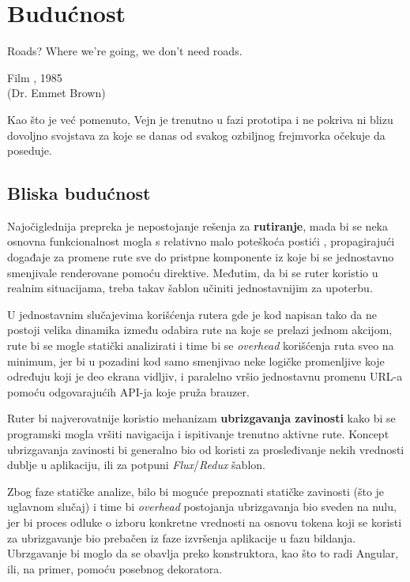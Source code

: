\chapter{Budućnost}

\epigraph{
  Roads? Where we're going, we don't need roads.
}{Film , 1985\\(Dr. Emmet Brown)}

Kao što je već pomenuto, Vejn je trenutno u fazi prototipa i ne pokriva ni blizu dovoljno svojstava za koje se danas od svakog ozbiljnog frejmvorka očekuje da poseduje.

\section{Bliska budućnost}

Najočiglednija prepreka je nepostojanje rešenja za \textbf{rutiranje}, mada bi se neka osnovna funkcionalnost mogla s relativno malo poteškoća postići , propagirajući događaje za promene rute sve do pristpne komponente iz koje bi se jednostavno smenjivale renderovane  pomoću  direktive.
Međutim, da bi se ruter koristio u realnim situacijama, treba takav šablon učiniti jednostavnijim za upoterbu.

U jednostavnim slučajevima korišćenja rutera gde je kod napisan tako da ne postoji velika dinamika između odabira rute na koje se prelazi jednom akcijom, rute bi se mogle statički analizirati i time bi se \textsl{overhead} korišćenja ruta sveo na minimum, jer bi u pozadini kod samo smenjivao neke logičke promenljive koje određuju koji je deo ekrana vidljiv, i paralelno vršio jednostavnu promenu URL-a pomoću odgovarajućih API-ja koje pruža brauzer.

Ruter bi najverovatnije koristio mehanizam \textbf{ubrizgavanja zavinosti} kako bi se programski mogla vršiti navigacija i ispitivanje trenutno aktivne rute.
Koncept ubrizgavanja zavinosti bi generalno bio od koristi za prosleđivanje nekih vrednosti dublje u aplikaciju, ili za potpuni \textsl{Flux}/\textsl{Redux} šablon.

Zbog faze statičke analize, bilo bi moguće prepoznati statičke zavinosti (što je uglavnom slučaj) i time bi \textsl{overhead} postojanja ubrizgavanja bio sveden na nulu, jer bi proces odluke o izboru konkretne vrednosti na osnovu tokena koji se koristi za ubrizgavanje bio prebačen iz faze izvršenja aplikacije u fazu bildanja.
Ubrzgavanje bi moglo da se obavlja preko konstruktora, kao što to radi Angular, ili, na primer, pomoću posebnog dekoratora.

